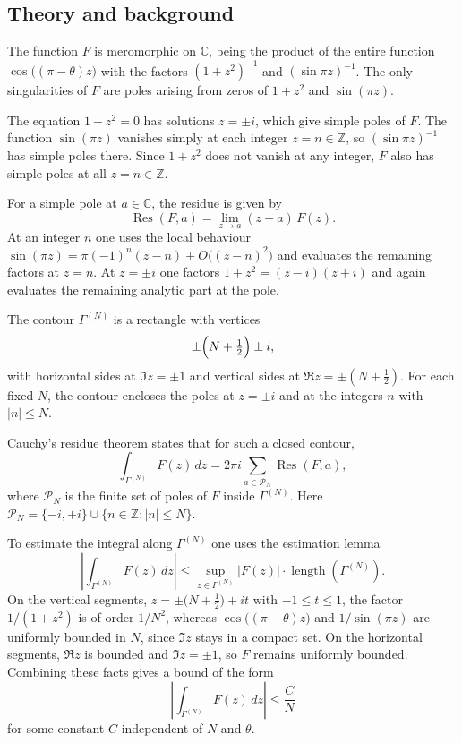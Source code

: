 \documentclass[12pt,a4paper]{article}
\theoremstyle{plain}
\theoremstyle{definition}
\theoremstyle{remark}
\theoremstyle{remark}
\DeclareMathOperator{\Res}{Res}
\begin{document}
\subsection*{Theory and background}

The function $F$ is meromorphic on $\mathbb{C}$, being the product of the entire function
$\cos\bigl((\pi-\theta)z\bigr)$ with the factors $(1+z^2)^{-1}$ and $(\sin\pi z)^{-1}$.
The only singularities of $F$ are poles arising from zeros of $1+z^2$ and $\sin(\pi z)$.

The equation $1+z^2=0$ has solutions $z=\pm i$, which give simple poles of $F$.
The function $\sin(\pi z)$ vanishes simply at each integer $z=n\in\mathbb{Z}$, so
$(\sin\pi z)^{-1}$ has simple poles there. Since $1+z^2$ does not vanish at any integer,
$F$ also has simple poles at all $z=n\in\mathbb{Z}$.

For a simple pole at $a\in\mathbb{C}$, the residue is given by
\[
\Res(F,a) = \lim_{z\to a} (z-a)\,F(z).
\]
At an integer $n$ one uses the local behaviour
$\sin(\pi z) = \pi(-1)^n(z-n) + O\bigl((z-n)^2\bigr)$ and evaluates the remaining factors at $z=n$.
At $z=\pm i$ one factors $1+z^2=(z-i)(z+i)$ and again evaluates the remaining analytic part at the pole.

The contour $\Gamma^{(N)}$ is a rectangle with vertices
\[
\pm\Bigl(N+\tfrac12\Bigr)\pm i,
\]
with horizontal sides at $\Im z=\pm1$ and vertical sides at $\Re z=\pm(N+\tfrac12)$.
For each fixed $N$, the contour encloses the poles at $z=\pm i$ and at the integers $n$ with $|n|\le N$.

Cauchy’s residue theorem states that for such a closed contour,
\[
\int_{\Gamma^{(N)}} F(z)\,dz
= 2\pi i \sum_{a\in\mathcal{P}_N} \Res(F,a),
\]
where $\mathcal{P}_N$ is the finite set of poles of $F$ inside $\Gamma^{(N)}$.
Here $\mathcal{P}_N=\{-i,+i\}\cup\{n\in\mathbb{Z}:|n|\le N\}$.

To estimate the integral along $\Gamma^{(N)}$ one uses the estimation lemma
\[
\left|\int_{\Gamma^{(N)}} F(z)\,dz\right|
\le \sup_{z\in\Gamma^{(N)}} |F(z)|\cdot \operatorname{length}(\Gamma^{(N)}).
\]
On the vertical segments, $z = \pm\bigl(N+\tfrac12\bigr) + it$ with $-1\le t\le 1$, the factor
$1/(1+z^2)$ is of order $1/N^2$, whereas $\cos\bigl((\pi-\theta)z\bigr)$ and
$1/\sin(\pi z)$ are uniformly bounded in $N$, since $\Im z$ stays in a compact set.
On the horizontal segments, $\Re z$ is bounded and $\Im z=\pm1$, so $F$ remains uniformly bounded.
Combining these facts gives a bound of the form
\[
\left|\int_{\Gamma^{(N)}} F(z)\,dz\right|
\le \frac{C}{N}
\]
for some constant $C$ independent of $N$ and $\theta$.
\end{document}
